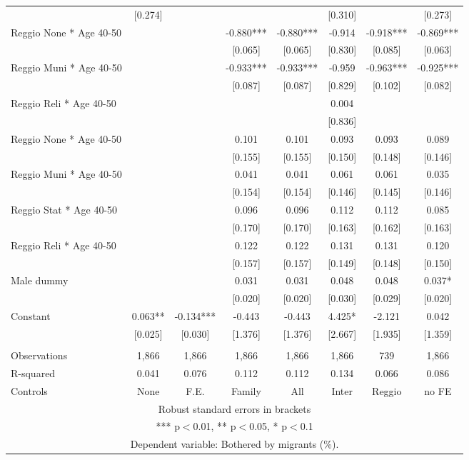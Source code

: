 \begin{tabular}{lccccccc}
 & [0.274] &  &  &  & [0.310] &  & [0.273] \\
Reggio None * Age 40-50 &  &  & -0.880*** & -0.880*** & -0.914 & -0.918*** & -0.869*** \\
 &  &  & [0.065] & [0.065] & [0.830] & [0.085] & [0.063] \\
Reggio Muni * Age 40-50 &  &  & -0.933*** & -0.933*** & -0.959 & -0.963*** & -0.925*** \\
 &  &  & [0.087] & [0.087] & [0.829] & [0.102] & [0.082] \\
Reggio Reli * Age 40-50 &  &  &  &  & 0.004 &  &  \\
 &  &  &  &  & [0.836] &  &  \\
Reggio None * Age 40-50 &  &  & 0.101 & 0.101 & 0.093 & 0.093 & 0.089 \\
 &  &  & [0.155] & [0.155] & [0.150] & [0.148] & [0.146] \\
Reggio Muni * Age 40-50 &  &  & 0.041 & 0.041 & 0.061 & 0.061 & 0.035 \\
 &  &  & [0.154] & [0.154] & [0.146] & [0.145] & [0.146] \\
Reggio Stat * Age 40-50 &  &  & 0.096 & 0.096 & 0.112 & 0.112 & 0.085 \\
 &  &  & [0.170] & [0.170] & [0.163] & [0.162] & [0.163] \\
Reggio Reli * Age 40-50 &  &  & 0.122 & 0.122 & 0.131 & 0.131 & 0.120 \\
 &  &  & [0.157] & [0.157] & [0.149] & [0.148] & [0.150] \\
Male dummy &  &  & 0.031 & 0.031 & 0.048 & 0.048 & 0.037* \\
 &  &  & [0.020] & [0.020] & [0.030] & [0.029] & [0.020] \\
Constant & 0.063** & -0.134*** & -0.443 & -0.443 & 4.425* & -2.121 & 0.042 \\
 & [0.025] & [0.030] & [1.376] & [1.376] & [2.667] & [1.935] & [1.359] \\
 &  &  &  &  &  &  &  \\
Observations & 1,866 & 1,866 & 1,866 & 1,866 & 1,866 & 739 & 1,866 \\
R-squared & 0.041 & 0.076 & 0.112 & 0.112 & 0.134 & 0.066 & 0.086 \\
 Controls & None & F.E. & Family & All & Inter & Reggio & no FE \\ \hline
\multicolumn{8}{c}{ Robust standard errors in brackets} \\
\multicolumn{8}{c}{ *** p$<$0.01, ** p$<$0.05, * p$<$0.1} \\
\multicolumn{8}{c}{ Dependent variable: Bothered by migrants (\%).} \\
\end{tabular}
